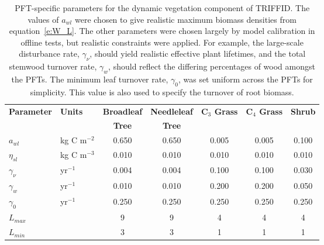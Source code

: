 \documentclass[a4paper]{article}
\begin{document}
\begin{table}[tb]
\begin{center}
\begin{tabular}{|ll|c|c|c|c|c|} \hline
{\bf Parameter}   &{\bf Units}  & {\bf Broadleaf}& {\bf Needleleaf} & {\bf C$_{3}$ Grass} & {\bf C$_{4}$ Grass} & {\bf Shrub} \\
                  &             & {\bf Tree}     & {\bf Tree} &&&   \\ \hline
$a_{wl}$   & kg C m$^{-2}$ & 0.650 & 0.650 & 0.005 & 0.005 & 0.100 \\
$\eta_{sl}$  & kg C m$^{-3}$ & 0.010 & 0.010 & 0.010 & 0.010 & 0.010 \\
$\gamma_{\nu}$ & yr$^{-1}$ & 0.004 & 0.004 & 0.100 & 0.100 & 0.030 \\
$\gamma_{w}$ & yr$^{-1}$   & 0.010 & 0.010 & 0.200& 0.200 & 0.050 \\
$\gamma_{0}$ & yr$^{-1}$   & 0.250 & 0.250 & 0.250 &0.250 & 0.250 \\
$L_{max}$    &             &  9 &  9 & 4 & 4 & 4 \\
$L_{min}$    &             &  3 &  3 & 1 & 1 & 1 \\ \hline 
\end{tabular}
\caption{PFT-specific parameters for the dynamic vegetation component
of TRIFFID.  The values of $a_{wl}$ were chosen to give realistic
maximum biomass densities from equation~\eqref{e:W_L}. The other
parameters were chosen largely by model calibration in offline tests,
but realistic constraints were applied. For example, the large-scale
disturbance rate, $\gamma_{\nu}$, should yield realistic effective
plant lifetimes, and the total stemwood turnover rate, $\gamma_{w}$,
should reflect the differing percentages of wood amongst the PFTs. The
minimum leaf turnover rate, $\gamma_{0}$, was set uniform across the
PFTs for simplicity. This value is also used to specify the turnover
of root biomass.}
\label{t:TRIF}
\end{center}
\end{table}
\end{document}
